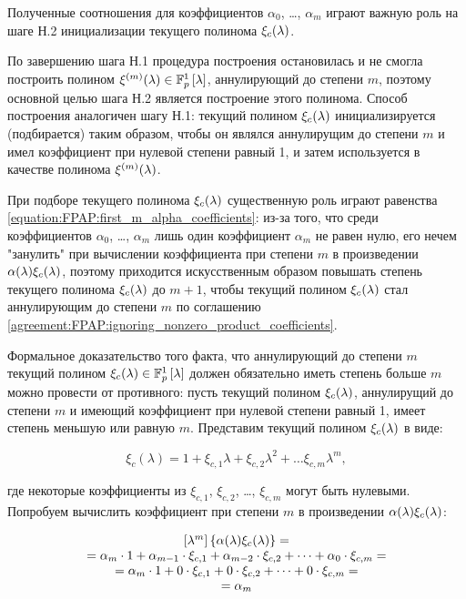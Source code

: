 Полученные соотношения для коэффициентов $\alpha_0$, \dots, $\alpha_m$ играют важную роль на шаге Н.2 инициализации текущего полинома
$\xi_c (\lambda)$.

По завершению шага Н.1 процедура построения остановилась и не смогла построить полином $\xi^{(m)} (\lambda) \in \mathbb{F}_p^1 \left [ \lambda \right ]$,
аннулирующий до степени $m$, поэтому основной целью  шага Н.2 является построение этого полинома. Способ построения аналогичен шагу Н.1:
текущий полином $\xi_c (\lambda)$ инициализируется (подбирается) таким образом, чтобы он являлся аннулирущим до степени $m$ и имел
коэффициент при нулевой степени равный 1, и затем используется в качестве полинома $\xi^{(m)} (\lambda)$.

При подборе текущего полинома $\xi_c (\lambda)$ существенную роль играют равенства \eqref{equation:FPAP:first_m_alpha_coefficients}:
из-за того, что среди коэффициентов $\alpha_0$, \dots, $\alpha_m$ лишь один коэффициент $\alpha_m$ не равен нулю, его нечем "занулить"{}
при вычислении коэффициента при степени $m$ в произведении $\alpha (\lambda) \xi_c (\lambda)$, поэтому приходится искусственным образом
повышать степень текущего полинома $\xi_c (\lambda)$ до $m+1$, чтобы текущий полином $\xi_c (\lambda)$ стал аннулирующим до степени $m$
по соглашению \ref{agreement:FPAP:ignoring_nonzero_product_coefficients}.

Формальное доказательство того факта, что аннулирующий до степени $m$ текущий полином $\xi_c (\lambda) \in \mathbb{F}_p^1 \left [ \lambda \right ]$ должен
обязательно иметь степень больше $m$ можно провести от противного: пусть текущий полином $\xi_c (\lambda)$, аннулирущий до степени $m$
и имеющий коэффициент при нулевой степени равный 1, имеет степень меньшую или равную $m$. Представим текущий полином $\xi_c (\lambda)$
в виде:

	$$ \xi_c(\lambda) = 1 + \xi_{c,1} \lambda + \xi_{c,2} \lambda^2 + \dots \xi_{c,m} \lambda^m, $$

где некоторые коэффициенты из $\xi_{c,1}$, $\xi_{c,2}$, \dots, $\xi_{c,m}$ могут быть нулевыми. Попробуем вычислить коэффициент при степени
$m$ в произведении $\alpha (\lambda) \xi_c (\lambda)$:

	$$
		\begin{array}{c}
			\left [ \lambda^{m} \right ] \left \{ \alpha (\lambda) \xi_c (\lambda) \right \} = \\
			= \alpha_m \cdot 1 + \alpha_{m-1} \cdot \xi_{c,1} + \alpha_{m-2} \cdot \xi_{c,2} + \dots + \alpha_0 \cdot \xi_{c,m} = \\
			= \alpha_m \cdot 1 + 0 \cdot \xi_{c,1} + 0 \cdot \xi_{c,2} + \dots + 0 \cdot \xi_{c,m} = \\
			= \alpha_m \\
		\end{array}
	$$


